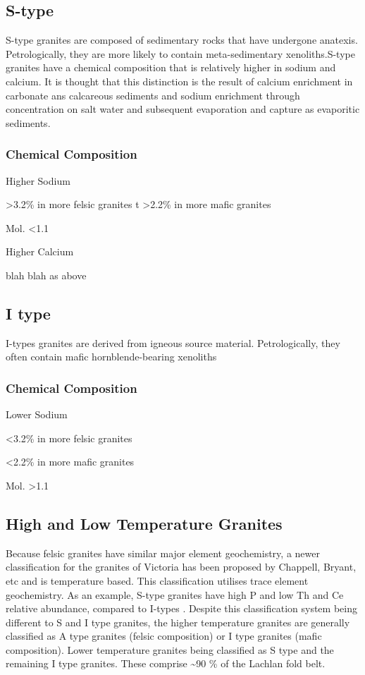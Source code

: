 \documentclass[a4paper]{article}
\begin{document}
\subsection{S-type}
S-type granites are composed of sedimentary rocks that have undergone anatexis.
Petrologically, they are more likely to contain meta-sedimentary xenoliths.S-type granites have a chemical composition that is relatively higher in sodium and calcium. It is thought that this distinction is the result of calcium enrichment in carbonate ans calcareous sediments and sodium enrichment through concentration on salt water and subsequent evaporation and capture as evaporitic sediments. 

\subsubsection{Chemical Composition}
Higher Sodium

 \textgreater 3.2\% in more felsic granites
t
 \textgreater 2.2\% in more mafic granites

Mol.  \textless 1.1

Higher Calcium

blah blah as above

\subsection{I type}
I-types granites are derived from igneous source material. Petrologically, they often contain mafic hornblende-bearing xenoliths

\subsubsection{Chemical Composition}
Lower Sodium

 \textless 3.2\% in more felsic granites

 \textless 2.2\% in more mafic granites

Mol.  \textgreater 1.1

\subsection{High and Low Temperature Granites}
Because felsic granites have similar major element geochemistry, a newer classification for the granites of Victoria has been proposed by Chappell, Bryant, etc and is temperature based. This classification utilises trace element geochemistry. As an example, S-type granites have high P and low Th and Ce relative abundance, compared to I-types \cite{chappell1998high}. Despite this classification system being different to S and I type granites, the higher temperature granites are generally classified as A type granites (felsic composition) or I type granites (mafic composition). Lower temperature granites being classified as S type and the remaining I type granites. These comprise \textasciitilde 90 \% of the Lachlan fold belt. \cite{chappell2001two}
\end{document}
